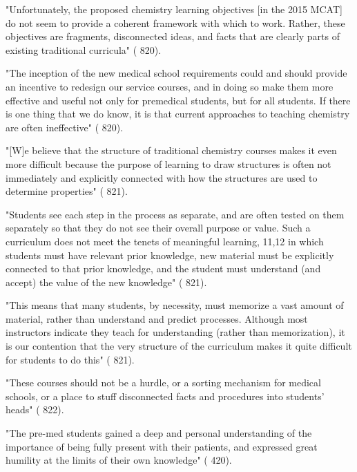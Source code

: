 "Unfortunately, the proposed chemistry learning objectives [in the 2015 MCAT] do not seem to provide a coherent framework with which to work. Rather, these objectives are fragments, disconnected ideas, and facts that are clearly parts of existing traditional curricula" (\cite{Cooper-2013} 820).

"The inception of the new medical school requirements could and should provide an incentive to redesign our service courses, and in doing so make them more effective and usefulnot only for premedical students, but for all students. If there is one thing that we do know, it is that current approaches to teaching chemistry are often ineffective" (\cite{Cooper-2013} 820).

"[W]e believe that the structure of traditional chemistry courses makes it even more difficult because the purpose of learning to draw structures is often not immediately and explicitly connected with how the structures are used to determine properties" (\cite{Cooper-2013} 821).

"Students see each step in the process as separate, and are often tested on them separately so that they do not see their overall purpose or value. Such a curriculum does not meet the tenets of meaningful learning, 11,12 in which students must have relevant prior knowledge, new material must be explicitly connected to that prior knowledge, and the student must understand (and accept) the value of the new knowledge" (\cite{Cooper-2013} 821).

"This means that many students, by necessity, must memorize a vast amount of material, rather than understand and predict processes. Although most instructors indicate they teach for understanding (rather than memorization), it is our contention that the very structure of the curriculum makes it quite difficult for students to do this" (\cite{Cooper-2013} 821).

"These courses should not be a hurdle, or a sorting mechanism for medical schools, or a place to stuff disconnected facts and procedures into students’ heads" (\cite{Cooper-2013} 822).


"The pre-med students gained a deep and personal understanding of the importance of being fully present with their patients, and expressed great humility at the limits of their own knowledge" (\cite{Doering-2015} 420).

